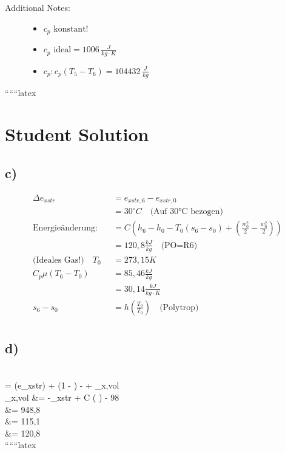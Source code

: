 \begin{description}
    \item[Additional Notes:] 
    \begin{itemize}
        \item $c_p \text{ konstant!}$
        \item $c_p \text{ ideal} = 1006 \, \frac{J}{kg \cdot K}$
        \item $c_p: c_p (T_5 - T_6) = 104432 \, \frac{J}{kg}$
    \end{itemize}
\end{description}

``````latex


\section*{Student Solution}

\subsection*{c)}
\begin{align*}
\Delta e_{xstr} &= e_{xstr,6} - e_{xstr,0} \\
&= 30^\circ C \quad \text{(Auf 30°C bezogen)} \\
\text{Energieänderung:} \quad &= C(h_6 - h_0 - T_0 (s_6 - s_0) + \left( \frac{w_0^2}{2} - \frac{w_0^2}{2} \right)) \\
&= 120,8 \frac{kJ}{kg} \quad \text{(PO=R6)} \\
\text{(Ideales Gas!)} \quad T_0 &= 273,15 K \\
C_p \mu (T_6 - T_0) &= 85,46 \frac{kJ}{kg} \\
&= 30,14 \frac{kJ}{kg \cdot K} \\
s_6 - s_0 &= h \left( \frac{T_0}{T_0} \right) \quad \text{(Polytrop)} \\
\end{align*}

\subsection*{d)}
 \\
 \quad \Theta =  (\Delta e_{xstr}) + (1 - )  -  + _{x,vol} \\
_{x,vol} &= -_{xstr} + C \left(  \right) - 98 \\
&= 948,8  \\
&= 115,1  \quad {} \\
&= 120,8 \\
``````latex



